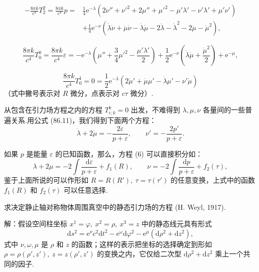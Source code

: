 \begin{xiti}
\begin{equation}
\begin{aligned}
  -\frac{8\pi k}{c^{4}}T_2^2=\frac{8\pi k}{c^{4}}p
  ={}&\frac{1}{4}\mathrm{e}^{-\lambda}
  (2\nu''+\nu'^{2}+2\mu''+\mu'^{2}
  -\mu'\lambda'-\nu'\lambda'+\mu'\nu')\\
  &+\frac{1}{4}\mathrm{e}^{-\nu}
  (\dot{\lambda}\dot{\nu}+\dot{\mu}\dot{\nu}
  -\dot{\lambda}\dot{\mu}-2\ddot{\lambda}-\dot{\lambda}^{2}
  -2\ddot{\mu}-\dot{\mu}^{2}),
\end{aligned}
\tag{3}
\end{equation}

\begin{equation}
  \frac{8\pi k}{c^{4}}T_0^0=\frac{8\pi k}{c^{4}}\varepsilon
  =-\mathrm{e}^{-\lambda}\left(\mu''+\frac{3}{4}\mu'^{2}
  -\frac{\mu'\lambda'}{2}\right)
  +\frac{1}{2}\mathrm{e}^{-\nu}\left(\dot{\lambda}\dot{\mu}
  +\frac{\dot{\mu}^{2}}{2}\right)+\mathrm{e}^{-\mu},
  \tag{4}
\end{equation}

\begin{equation}
  \frac{8\pi k}{c^{4}}T_0^1=0
  =\frac{1}{2}\mathrm{e}^{-\lambda}
  (2\dot{\mu}'+\dot{\mu}\mu'-\dot{\lambda}\mu'-\nu'\dot{\mu})
  \tag{5}
\end{equation}
（式中撇号表示对 $R$ 微分，点表示对 $c\tau$ 微分）.

从包含在引力场方程之内的方程 $T_{i;k}^k=0$ 出发，不难得到 $\lambda,\mu,\nu$ 各量间的一些普遍关系.用公式 (86.11)，我们得到下面两个方程：
\begin{equation}
  \dot{\lambda}+2\dot{\mu}=-\frac{2\dot{\varepsilon}}{p+\varepsilon},
  \qquad
  \nu'=-\frac{2p'}{p+\varepsilon}.
  \tag{6}
\end{equation}

如果 $p$ 是能量 $\varepsilon$ 的已知函数，那么，方程 (6) 可以直接积分如：
\begin{equation}
  \lambda+2\mu=-2\int\frac{\mathrm{d}\varepsilon}{p+\varepsilon}
  +f_1(R),\qquad
  \nu=-2\int\frac{\mathrm{d}p}{p+\varepsilon}+f_2(\tau),
  \tag{7}
\end{equation}
鉴于上面所说的可以作形如 $R=R(R'),\ \tau=\tau(\tau')$ 的任意变换，上式中的函数 $f_1(R)$ 和 $f_2(\tau)$ 可以任意选择.

\quad 求决定静止轴对称物体周围真空中的静态引力场的方程 (H. Weyl, 1917).

解：假设空间柱坐标 $x^1=\varphi,\ x^2=\rho,\ x^3=z$ 中的静态线元具有形式
\begin{equation*}
  \mathrm{d}s^{2}=\mathrm{e}^{\nu}c^{2}\mathrm{d}t^{2}
  -\mathrm{e}^{\omega}\mathrm{d}\varphi^{2}
  -\mathrm{e}^{\mu}(\mathrm{d}\rho^{2}+\mathrm{d}z^{2}),
\end{equation*}
式中 $\nu,\omega,\mu$ 是 $\rho$ 和 $z$ 的函数；这样的表示把坐标的选择确定到形如 $\rho=\rho(\rho',z'),\ z=z(\rho',z')$ 的变换之内，它仅给二次型 $\mathrm{d}\rho^{2}+\mathrm{d}z^{2}$ 乘上一个共同的因子.


\end{xiti}
